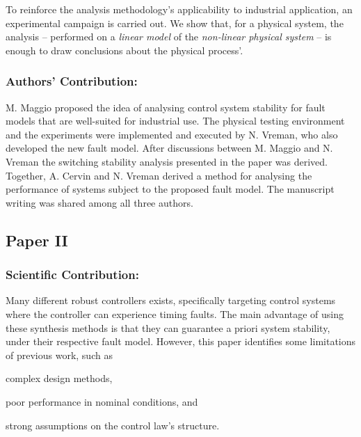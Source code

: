 To reinforce the analysis methodology's applicability to industrial application, an experimental campaign is carried out.
We show that, for a physical system, the analysis -- performed on a \emph{linear model} of the \emph{non-linear physical system} -- is enough to draw conclusions about the physical process'.

\subsubsection*{Authors' Contribution:}%
%
M. Maggio proposed the idea of analysing control system stability for fault models that are well-suited for industrial use.
The physical testing environment and the experiments were implemented and executed by N. Vreman, who also developed the new fault model.
After discussions between M. Maggio and N. Vreman the switching stability analysis presented in the paper was derived.
Together, A. Cervin and N. Vreman derived a method for analysing the performance of systems subject to the proposed fault model.
The manuscript writing was shared among all three authors.


\clearpage %

\subsection*{Paper II}%
%
\begin{quote}
\end{quote}

\subsubsection*{Scientific Contribution:}%
%
Many different robust controllers exists, specifically targeting control systems where the controller can experience timing faults.
The main advantage of using these synthesis methods is that they can guarantee a priori system stability, under their respective fault model.
However, this paper identifies some limitations of previous work, such as
\begin{enumerate*}[label=(\roman*)]
    \item complex design methods,
    \item poor performance in nominal conditions, and
    \item strong assumptions on the control law's structure.
\end{enumerate*}

